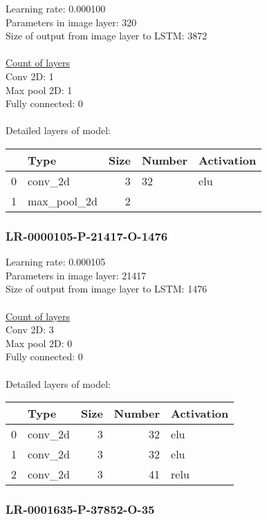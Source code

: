 Learning rate: 0.000100
\\Parameters in image layer: 320
\\Size of output from image layer to LSTM: 3872
\\\\\underline{Count of layers} 
\\Conv 2D:           1\\Max pool 2D:      1\\Fully connected:  0
\\\\Detailed layers of model: \\\begin{tabular}{rlrll}
\hline
    & Type        &   Size & Number   & Activation   \\
\hline
  0 & conv\_2d     &      3 & 32       & elu          \\
  1 & max\_pool\_2d &      2 &          &              \\
\hline
\end{tabular}\subsubsection*{LR-0000105-P-21417-O-1476}
Learning rate: 0.000105
\\Parameters in image layer: 21417
\\Size of output from image layer to LSTM: 1476
\\\\\underline{Count of layers} 
\\Conv 2D:           3\\Max pool 2D:      0\\Fully connected:  0
\\\\Detailed layers of model: \\\begin{tabular}{rlrrl}
\hline
    & Type    &   Size &   Number & Activation   \\
\hline
  0 & conv\_2d &      3 &       32 & elu          \\
  1 & conv\_2d &      3 &       32 & elu          \\
  2 & conv\_2d &      3 &       41 & relu         \\
\hline
\end{tabular}\subsubsection*{LR-0001635-P-37852-O-35}
